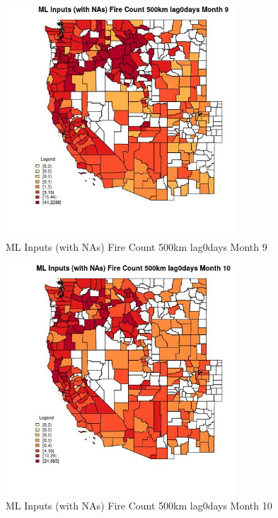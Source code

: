 \begin{figure} 
\centering  
\includegraphics[width=0.77\textwidth]{Code_Outputs/Report_ML_input_PM25_Step4_part_e_de_duplicated_aves_compiled_2019-05-21wNAs_CountyFire_Count_500km_lag0daysmedianMonth9.jpg} 
\caption{\label{fig:Report_ML_input_PM25_Step4_part_e_de_duplicated_aves_compiled_2019-05-21wNAsCountyFire_Count_500km_lag0daysmedianMonth9}ML Inputs (with NAs) Fire Count 500km lag0days Month 9} 
\end{figure} 
 

\begin{figure} 
\centering  
\includegraphics[width=0.77\textwidth]{Code_Outputs/Report_ML_input_PM25_Step4_part_e_de_duplicated_aves_compiled_2019-05-21wNAs_CountyFire_Count_500km_lag0daysmedianMonth10.jpg} 
\caption{\label{fig:Report_ML_input_PM25_Step4_part_e_de_duplicated_aves_compiled_2019-05-21wNAsCountyFire_Count_500km_lag0daysmedianMonth10}ML Inputs (with NAs) Fire Count 500km lag0days Month 10} 
\end{figure} 
 

